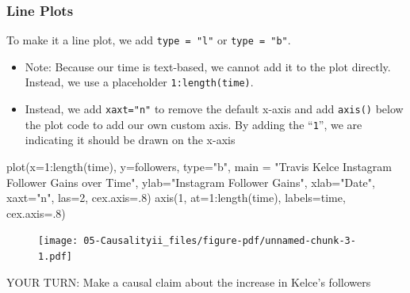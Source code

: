 \documentclass[
  letterpaper,
  DIV=11,
  numbers=noendperiod]{scrreprt}
\newenvironment{Shaded}{\begin{snugshade}}{\end{snugshade}}
\newcommand{\AttributeTok}[1]{\textcolor[rgb]{0.40,0.45,0.13}{#1}}
\newcommand{\DecValTok}[1]{\textcolor[rgb]{0.68,0.00,0.00}{#1}}
\newcommand{\FunctionTok}[1]{\textcolor[rgb]{0.28,0.35,0.67}{#1}}
\newcommand{\NormalTok}[1]{\textcolor[rgb]{0.00,0.23,0.31}{#1}}
\newcommand{\SpecialCharTok}[1]{\textcolor[rgb]{0.37,0.37,0.37}{#1}}
\newcommand{\StringTok}[1]{\textcolor[rgb]{0.13,0.47,0.30}{#1}}
\providecommand{\tightlist}{%
  \setlength{\itemsep}{0pt}\setlength{\parskip}{0pt}}\usepackage{longtable,booktabs,array}
\begin{document}
\hypertarget{line-plots-1}{%
\subsubsection{Line Plots}\label{line-plots-1}}

To make it a line plot, we add \texttt{type\ =\ "l"} or
\texttt{type\ =\ "b"}.

\begin{itemize}
\tightlist
\item
  Note: Because our time is text-based, we cannot add it to the plot
  directly. Instead, we use a placeholder \texttt{1:length(time)}.
\item
  Instead, we add \texttt{xaxt="n"} to remove the default x-axis and add
  \texttt{axis()} below the plot code to add our own custom axis. By
  adding the ``\texttt{1}'', we are indicating it should be drawn on the
  x-axis
\end{itemize}

\begin{Shaded}
\begin{Highlighting}[]
\FunctionTok{plot}\NormalTok{(}\AttributeTok{x=}\DecValTok{1}\SpecialCharTok{:}\FunctionTok{length}\NormalTok{(time), }\AttributeTok{y=}\NormalTok{followers,}
     \AttributeTok{type=}\StringTok{"b"}\NormalTok{,}
     \AttributeTok{main =} \StringTok{"Travis Kelce Instagram Follower Gains over Time"}\NormalTok{,}
     \AttributeTok{ylab=}\StringTok{"Instagram Follower Gains"}\NormalTok{,}
     \AttributeTok{xlab=}\StringTok{"Date"}\NormalTok{,}
     \AttributeTok{xaxt=}\StringTok{"n"}\NormalTok{,}
     \AttributeTok{las=}\DecValTok{2}\NormalTok{, }\AttributeTok{cex.axis=}\NormalTok{.}\DecValTok{8}\NormalTok{)}
\FunctionTok{axis}\NormalTok{(}\DecValTok{1}\NormalTok{, }\AttributeTok{at=}\DecValTok{1}\SpecialCharTok{:}\FunctionTok{length}\NormalTok{(time), }\AttributeTok{labels=}\NormalTok{time, }\AttributeTok{cex.axis=}\NormalTok{.}\DecValTok{8}\NormalTok{)}
\end{Highlighting}
\end{Shaded}

\begin{figure}[H]

{\centering \texttt{[image: 05-Causalityii\_files/figure-pdf/unnamed-chunk-3-1.pdf]}

}

\end{figure}

YOUR TURN: Make a causal claim about the increase in Kelce's followers
\end{document}
